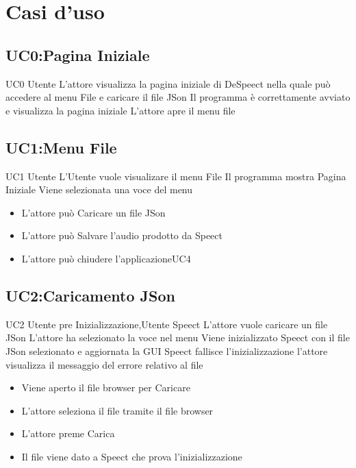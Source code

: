 \documentclass[../AnalisideiRequisiti.tex]{subfiles}
\begin{document}

	\chapter{Casi d'uso}
	\section{UC0:Pagina Iniziale}
	\UserCase
	{UC0}
	{Utente}
	{}
	{L'attore visualizza la pagina iniziale di DeSpeect nella quale può accedere al menu File e caricare il file JSon}
	{Il programma è correttamente avviato e visualizza la pagina iniziale}
	{L'attore apre il menu file}
	{}
	{}
	\section{UC1:Menu File}
	\UserCase
	{UC1}
	{Utente}
	{}
	{L'Utente vuole visualizare il menu File}
	{Il programma mostra Pagina Iniziale }
	{Viene selezionata una voce del menu}
	{}
	{	\begin{itemize}
		\item{} L'attore può Caricare un file JSon 
		\item{} L'attore può Salvare l'audio prodotto da Speect 
		\item{} L'attore può chiudere l'applicazione{UC4}
		\end{itemize}
	}

	\section{UC2:Caricamento JSon}
	\UserCase
	{UC2}
	{Utente pre Inizializzazione,Utente}
	{Speect}
	{L'attore vuole caricare un file JSon}
	{L'attore ha selezionato la voce nel menu}
	{Viene inizializzato Speect con il file JSon selezionato e aggiornata la GUI}
	{Speect fallisce l'inizializzazione l'attore visualizza il messaggio del errore relativo al file }
	{
		\begin{itemize}
			\item{} Viene aperto il file browser per Caricare
			\item{} L'attore seleziona il file tramite il file browser 
			\item{} L'attore preme Carica
			\item{} Il file viene dato a Speect che prova l'inizializzazione
		\end{itemize}	
	}
\end{document}
